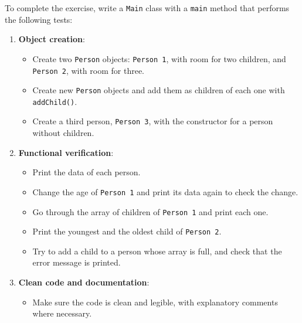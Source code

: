 To complete the exercise, write a \texttt{Main} class with a \texttt{main} method that performs the following tests:

\begin{enumerate}

    \item \textbf{Object creation}:

        \begin{itemize}

            \item Create two \texttt{Person} objects: \texttt{Person 1}, with room for two children, and \texttt{Person 2}, with room for three.

            \item Create new \texttt{Person} objects and add them as children of each one with \texttt{addChild()}.

            \item Create a third person, \texttt{Person 3}, with the constructor for a person without children.

        \end{itemize}

    \item \textbf{Functional verification}:

        \begin{itemize}

            \item Print the data of each person.

            \item Change the age of \texttt{Person 1} and print its data again to check the change.

            \item Go through the array of children of \texttt{Person 1} and print each one.

            \item Print the youngest and the oldest child of \texttt{Person 2}.

            \item Try to add a child to a person whose array is full, and check that the error message is printed.

        \end{itemize}

    \item \textbf{Clean code and documentation}:

        \begin{itemize}

            \item Make sure the code is clean and legible, with explanatory comments where necessary.

        \end{itemize}

\end{enumerate}
